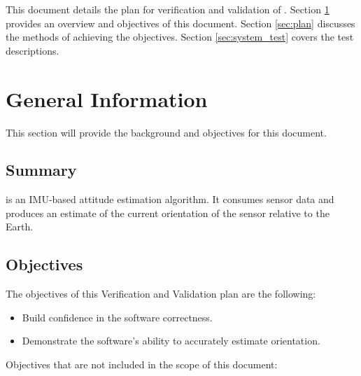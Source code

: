 \documentclass[12pt, titlepage]{article}
\begin{document}
This document details the plan for verification and validation of \progname{}. Section
\ref{sec:general} provides an overview and objectives of this document. Section \ref{sec:plan}
discusses the methods of achieving the objectives. Section \ref{sec:system_test} covers the test
descriptions.


\section{General Information} \label{sec:general}

This section will provide the background and objectives for this document.

\subsection{Summary}

\progname{} is an IMU-based attitude estimation algorithm. It consumes sensor data and produces an
estimate of the current orientation of the sensor relative to the Earth.


\subsection{Objectives}

The objectives of this Verification and Validation plan are the following:

\begin{itemize}
    \item Build confidence in the software correctness.
    \item Demonstrate the software's ability to accurately estimate orientation.
\end{itemize}


\noindent
Objectives that are not included in the scope of this document:
\end{document}
